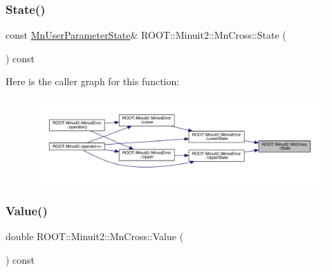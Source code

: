 \mbox{\label{classROOT_1_1Minuit2_1_1MnCross_a97ba8e698ee948a842f0ebe198c0d528}} 
\subsubsection{\texorpdfstring{State()}{State()}\hspace{0.1cm}{\footnotesize\ttfamily [2/2]}}
{\footnotesize\ttfamily const \mbox{\hyperlink{classROOT_1_1Minuit2_1_1MnUserParameterState}{Mn\+User\+Parameter\+State}}\& R\+O\+O\+T\+::\+Minuit2\+::\+Mn\+Cross\+::\+State (\begin{DoxyParamCaption}{ }\end{DoxyParamCaption}) const\hspace{0.3cm}{\ttfamily [inline]}}

Here is the caller graph for this function\+:\nopagebreak
\begin{figure}[H]
\begin{center}
\leavevmode
\includegraphics[width=350pt]{d3/db2/classROOT_1_1Minuit2_1_1MnCross_a97ba8e698ee948a842f0ebe198c0d528_icgraph}
\end{center}
\end{figure}
\mbox{\label{classROOT_1_1Minuit2_1_1MnCross_af7cebab3edb3fedaf0e4ce0704e1196f}} 
\subsubsection{\texorpdfstring{Value()}{Value()}\hspace{0.1cm}{\footnotesize\ttfamily [1/2]}}
{\footnotesize\ttfamily double R\+O\+O\+T\+::\+Minuit2\+::\+Mn\+Cross\+::\+Value (\begin{DoxyParamCaption}{ }\end{DoxyParamCaption}) const\hspace{0.3cm}{\ttfamily [inline]}}

